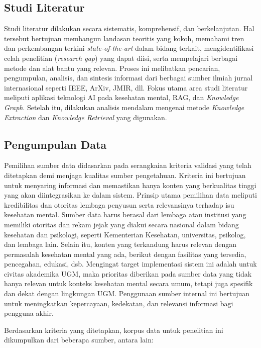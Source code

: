 \subsection{Studi Literatur}
Studi literatur dilakukan secara sistematis, komprehensif, dan berkelanjutan.
Hal tersebut bertujuan membangun landasan teoritis yang kokoh, memahami tren dan perkembangan terkini \textit{state-of-the-art} dalam bidang terkait, mengidentifikasi celah penelitian (\textit{research gap}) yang dapat diisi, serta mempelajari berbagai metode dan alat bantu yang relevan.
Proses ini melibatkan pencarian, pengumpulan, analisis, dan sintesis informasi dari berbagai sumber ilmiah jurnal internasional seperti IEEE, ArXiv, JMIR, dll.
Fokus utama area studi literatur meliputi aplikasi teknologi AI pada kesehatan mental, RAG, dan \textit{Knowledge Graph}.
Setelah itu, dilakukan analisis mendalam mengenai metode \textit{Knowledge Extraction} dan \textit{Knowledge Retrieval} yang digunakan.

\subsection{Pengumpulan Data}
Pemilihan sumber data didasarkan pada serangkaian kriteria validasi yang telah ditetapkan demi menjaga kualitas sumber pengetahuan.
Kriteria ini bertujuan untuk menyaring informasi dan memastikan hanya konten yang berkualitas tinggi yang akan diintegrasikan ke dalam sistem.
Prinsip utama pemilihan data meliputi kredibilitas dan otoritas lembaga penyusun serta relevansinya terhadap isu kesehatan mental.
Sumber data harus berasal dari lembaga atau institusi yang memiliki otoritas dan rekam jejak yang diakui secara nasional dalam bidang kesehatan dan psikologi, seperti Kementerian Kesehatan, universitas, psikolog, dan lembaga lain.
Selain itu, konten yang terkandung harus relevan dengan permasalah kesehatan mental yang ada, berikut dengan fasilitas yang tersedia, pencegahan, edukasi, dsb.
Mengingat target implementasi sistem ini adalah untuk civitas akademika UGM, maka prioritas diberikan pada sumber data yang tidak hanya relevan untuk konteks kesehatan mental secara umum, tetapi juga spesifik dan dekat dengan lingkungan UGM.
Penggunaan sumber internal ini bertujuan untuk meningkatkan kepercayaan, kedekatan, dan relevansi informasi bagi pengguna akhir.

Berdasarkan kriteria yang ditetapkan, korpus data untuk penelitian ini dikumpulkan dari beberapa sumber, antara lain:

